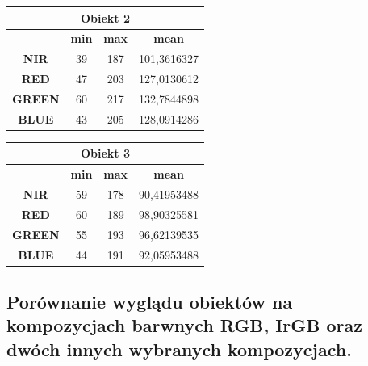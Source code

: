 \documentclass[a4paper,12pt]{article}  %
\begin{document}
\begin{table}[h!]
\centering
\begin{tabular}{|c|c|c|c|}
\hline
\multicolumn{4}{|c|}{\textbf{Obiekt 2}} \\ \hline
\textbf{} & \textbf{min} & \textbf{max} & \textbf{mean} \\ \hline
\textbf{NIR} & 39 & 187 & 101,3616327\\ \hline
\textbf{RED} & 47 & 203 & 127,0130612\\ \hline
\textbf{GREEN} & 60 & 217 & 132,7844898\\ \hline
\textbf{BLUE} & 43 & 205 & 128,0914286\\ \hline
\end{tabular}
\end{table}

\begin{table}[h!]
\centering
\begin{tabular}{|c|c|c|c|}
\hline
\multicolumn{4}{|c|}{\textbf{Obiekt 3}} \\ \hline
\textbf{} & \textbf{min} & \textbf{max} & \textbf{mean} \\ \hline
\textbf{NIR} & 59 & 178 & 90,41953488\\ \hline
\textbf{RED} & 60 & 189 & 98,90325581\\ \hline
\textbf{GREEN} & 55 & 193 & 96,62139535\\ \hline
\textbf{BLUE} & 44 & 191 & 92,05953488\\ \hline
\end{tabular}
\end{table}

\subsection{Porównanie wyglądu obiektów na kompozycjach barwnych RGB, IrGB oraz dwóch innych wybranych kompozycjach.}
\end{document}
